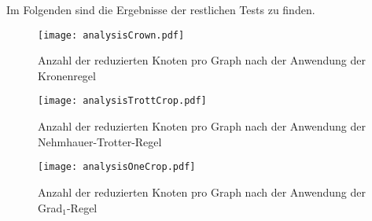 Im Folgenden sind die Ergebnisse der restlichen Tests zu finden.

\begin{figure}[htb]
\centering
  	{\texttt{[image: analysisCrown.pdf]}}
	\caption{Anzahl der reduzierten Knoten pro Graph nach der Anwendung der Kronenregel\label{fig:crown}}
\centering
\end{figure}


\begin{figure}[htb]
\centering
  	{\texttt{[image: analysisTrottCrop.pdf]}}
	\caption{Anzahl der reduzierten Knoten pro Graph nach der Anwendung der Nehmhauer-Trotter-Regel\label{fig:trott}}
\centering
\end{figure}


\begin{figure}[htb]
\centering
  	{\texttt{[image: analysisOneCrop.pdf]}}
	\caption{Anzahl der reduzierten Knoten pro Graph nach der Anwendung der Grad$_{1}$-Regel\label{fig:one}}
\centering
\end{figure}

